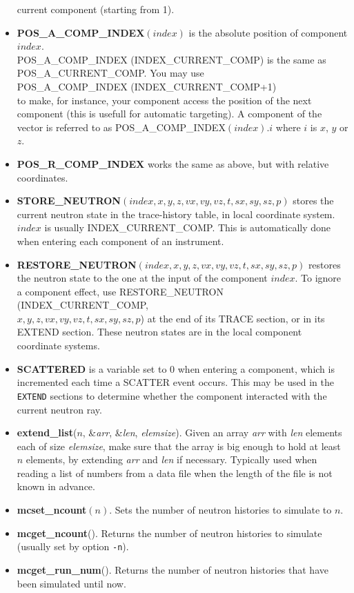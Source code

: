 \begin{itemize}
       current component  (starting from 1).
\item \textbf{POS\_A\_COMP\_INDEX}$(index)$ is the absolute position of
  component $index$. \\
  POS\_A\_COMP\_INDEX (INDEX\_CURRENT\_COMP) is the same as \\
  POS\_A\_CURRENT\_COMP. You may use \\
  POS\_A\_COMP\_INDEX  (INDEX\_CURRENT\_COMP+1) \\
  to make, for instance, your
  component access the position of the next component (this is usefull for
  automatic targeting).  A component of the vector is referred to as
  POS\_A\_COMP\_INDEX$(index).i$ where $i$ is $x$, $y$ or $z$.
\item \textbf{POS\_R\_COMP\_INDEX} works the same as above,
  but with relative coordinates.
\item \textbf{STORE\_NEUTRON}$(index, x, y, z, vx, vy, vz, t, sx, sy,
sz, p)$ stores the current neutron state in the trace-history table,
in local coordinate system. $index$ is usually INDEX\_CURRENT\_COMP.
This is automatically done when entering each component of an
instrument.
\item \textbf{RESTORE\_NEUTRON}$(index, x, y, z, vx, vy, vz, t, sx, sy,
sz, p)$ restores the neutron state to the one at the input of the
component $index$. To ignore a component effect, use
RESTORE\_NEUTRON (INDEX\_CURRENT\_COMP, \\
$x, y, z, vx, vy, vz, t,
sx, sy, sz, p$) at the end of its TRACE section, or in its EXTEND
section. These neutron states are in the local component coordinate
systems.
\item \textbf{SCATTERED} is a variable set to 0 when entering
  a component, which is incremented each time a SCATTER event occurs.
  This may be used in the \verb+EXTEND+ sections to determine whether
  the component interacted with the current neutron ray.
\item \textbf{extend\_list}($n$, \&\textit{arr}, \&\textit{len},
  \textit{elemsize}). Given an array \textit{arr} with \textit{len}
  elements each of size \textit{elemsize}, make sure that the array is
  big enough to hold at least $n$ elements, by extending \textit{arr}
  and \textit{len} if necessary. Typically used when reading a list of
  numbers from a data file when the length of the file is not known in advance.
\item \textbf{mcset\_ncount}$(n)$. Sets the number of neutron histories to simulate to $n$.
\item \textbf{mcget\_ncount}(). Returns the number of neutron histories to simulate (usually set by option \verb+-n+).
\item \textbf{mcget\_run\_num}(). Returns the number of neutron histories that have been simulated until now.
\end{itemize}

